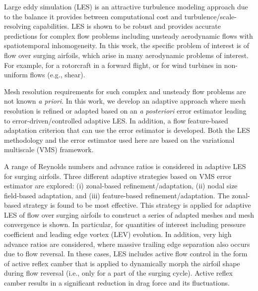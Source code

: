  
 
Large eddy simulation (LES) is an attractive turbulence modeling approach due to the balance it provides between computational cost and turbulence/scale-resolving capabilities. 
LES is shown to be robust and provides accurate predictions for complex flow problems including unsteady aerodynamic flows with spatiotemporal inhomogeneity.
In this work, the specific problem of interest is of flow over surging airfoils, which arise in many aerodynamic problems of interest. For example, for a rotorcraft in a forward flight, or for wind turbines in non-uniform flows (e.g., shear).

Mesh resolution requirements for such complex and unsteady flow problems are not known \textit{a priori}.
In this work, we develop an adaptive approach where mesh resolution is refined or adapted based on an \textit{a posteriori} error estimator leading to error-driven/controlled adaptive LES.
In addition, a flow feature-based adaptation criterion that can use the error estimator is developed.
Both the LES methodology and the error estimator used here are based on the variational multiscale (VMS) framework.

A range of Reynolds numbers and advance ratios is considered in adaptive LES for surging airfoils.
Three different adaptive strategies based on VMS error estimator are explored: (i) zonal-based refinement/adaptation, (ii) nodal size field-based adaptation, and (iii) feature-based refinement/adaptation.
The zonal-based strategy is found to be most effective. This strategy is applied for adaptive LES of flow over surging airfoils to construct a series of adapted meshes and mesh convergence is shown. In particular, for quantities of interest including pressure coefficient and leading edge vortex (LEV) evolution.
In addition, very high advance ratios are considered, where massive trailing edge separation also occurs due to flow reversal. In these cases, LES includes active flow control in the form of active reflex camber that is applied to dynamically morph the airfoil shape during flow reversal (i.e., only for a part of the surging cycle). Active reflex camber results in a significant reduction in drag force and its fluctuations.






